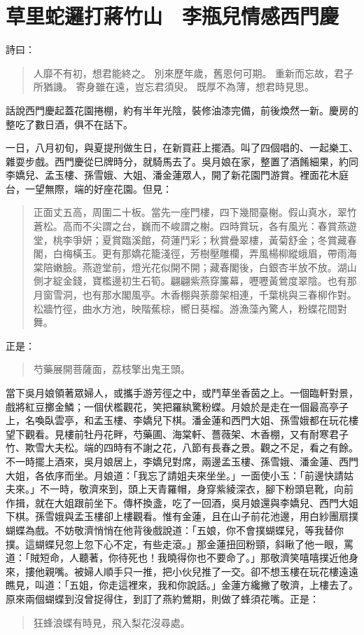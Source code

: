 
\chapter{草里蛇邏打蔣竹山　李瓶兒情感西門慶}

詩曰：
\begin{quote}
人靡不有初，想君能終之。
別來歷年歲，舊恩何可期。
重新而忘故，君子所猶譏。
寄身雖在遠，豈忘君須臾。
既厚不為薄，想君時見思。
\end{quote}

話說西門慶起蓋花園捲棚，約有半年光陰，裝修油漆完備，前後煥然一新。慶房的整吃了數日酒，俱不在話下。

一日，八月初旬，與夏提刑做生日，在新買莊上擺酒。叫了四個唱的、一起樂工、雜耍步戲。西門慶從巳牌時分，就騎馬去了。吳月娘在家，整置了酒餚細果，約同李嬌兒、孟玉樓、孫雪娥、大姐、潘金蓮眾人，開了新花園門游賞。裡面花木庭台，一望無際，端的好座花園。但見：
\begin{quote}
正面丈五高，周圍二十板。當先一座門樓，四下幾間臺榭。假山真水，翠竹蒼松。高而不尖謂之台，巍而不峻謂之榭。四時賞玩，各有風光：春賞燕遊堂，桃李爭妍；夏賞臨溪館，荷蓮鬥彩；秋賞疊翠樓，黃菊舒金；冬賞藏春閣，白梅橫玉。更有那嬌花籠淺徑，芳樹壓雕欄，弄風楊柳縱蛾眉，帶雨海棠陪嫩臉。燕遊堂前，燈光花似開不開；藏春閣後，白銀杏半放不放。湖山側才綻金錢，寶檻邊初生石筍。翩翩紫燕穿簾幕，嚦嚦黃鶯度翠陰。也有那月窗雪洞，也有那水閣風亭。木香棚與荼蘼架相連，千葉桃與三春柳作對。松牆竹徑，曲水方池，映階蕉棕，嚮日葵榴。游漁藻內驚人，粉蝶花間對舞。
\end{quote}
正是：
\begin{quote}
芍藥展開菩薩面，荔枝擎出鬼王頭。
\end{quote}

當下吳月娘領著眾婦人，或攜手游芳徑之中，或鬥草坐香茵之上。一個臨軒對景，戲將紅豆擲金鱗；一個伏檻觀花，笑把羅紈驚粉蝶。月娘於是走在一個最高亭子上，名喚臥雲亭，和孟玉樓、李嬌兒下棋。潘金蓮和西門大姐、孫雪娥都在玩花樓望下觀看。見樓前牡丹花畔，芍藥圃、海棠軒、薔薇架、木香棚，又有耐寒君子竹、欺雪大夫松。端的四時有不謝之花，八節有長春之景。觀之不足，看之有餘。不一時擺上酒來，吳月娘居上，李嬌兒對席，兩邊孟玉樓、孫雪娥、潘金蓮、西門大姐，各依序而坐。月娘道：「我忘了請姐夫來坐坐。」一面使小玉：「前邊快請姑夫來。」不一時，敬濟來到，頭上天青羅帽，身穿紫綾深衣，腳下粉頭皂靴，向前作揖，就在大姐跟前坐下。傳杯換盞，吃了一回酒，吳月娘還與李嬌兒、西門大姐下棋。孫雪娥與孟玉樓卻上樓觀看。惟有金蓮，且在山子前花池邊，用白紗團扇撲蝴蝶為戲。不妨敬濟悄悄在他背後戲說道：「五娘，你不會撲蝴蝶兒，等我替你撲。這蝴蝶兒忽上忽下心不定，有些走滾。」那金蓮扭回粉頸，斜瞅了他一眼，罵道：「賊短命，人聽著，你待死也！我曉得你也不要命了。」那敬濟笑嘻嘻撲近他身來，摟他親嘴。被婦人順手只一推，把小伙兒推了一交。卻不想玉樓在玩花樓遠遠瞧見，叫道：「五姐，你走這裡來，我和你說話。」金蓮方纔撇了敬濟，上樓去了。原來兩個蝴蝶到沒曾捉得住，到訂了燕約鶯期，則做了蜂須花嘴。正是：
\begin{quote}
狂蜂浪蝶有時見，飛入梨花沒尋處。
\end{quote}

